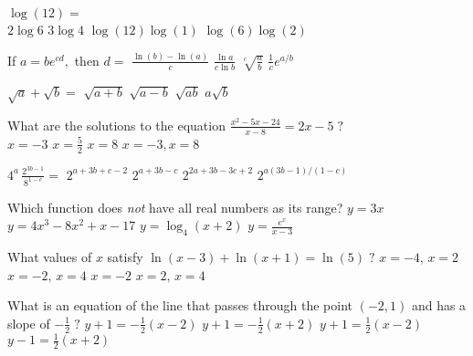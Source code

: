 \begin{question}
\(\log(12) =\) \\
\choices
{\(2 \log 6\)}
{\(3 \log 4\)}
{}
{\(\log(12) \log(1)\)}
{\(\log(6) \log(2)\)}
\end{question}

\begin{question}
If \(a = be^{cd},\) then \(d =\)
\choices
{\(\frac{\ln(b) - \ln(a)}{c}\)}
{\(\frac{\ln a}{c \ln b}\)}
{\(\sqrt[c]{\frac{a}{b}}\)}
{\(\frac{1}{c} e^{a/b}\)}
{}
\end{question}

\begin{question}
\(\sqrt a + \sqrt b = \)
\choices
{\(\sqrt{a + b}\)}
{\(\sqrt{a - b}\)}
{\(\sqrt{ab}\)}
{\(a \sqrt{b}\)}
{}
\end{question}

\begin{question} 
What are the solutions to the equation \(\frac{x^2 - 5x - 24}{x - 8} = 2x -5 \; ?\) \\ 
\choices
{\(x = -3\)}
{\(x = \frac{5}{2}\)}
{\(x = 8\)}
{\(x = -3, x = 8\)}
{}
\end{question}

\begin{question} 
\(4^a \, \frac{2^{3b - 1}}{8^{1 - c}} =\)
\choices
{\(2^{a + 3b + c - 2}\)}
{\(2^{a + 3b - c}\)}
{\(2^{2a + 3b - 3c + 2}\)}
{}
{\(2^{a(3b - 1)/(1 - c)}\)}
\end{question}

\begin{question}
Which function does \emph{not} have all real numbers as its range?
\choices
{\(y = 3x\)}
{\(y = 4x^3 - 8x^2 + x - 17\)}
{\(y = \log_4(x + 2)\)}
{}
{\(y = \frac{e^x}{x - 3}\)}
\end{question}

\begin{question}
What values of \(x\) satisfy \(\ln(x - 3) + \ln(x + 1) = \ln(5) \; ?\) 
\choices
{\(x = -4, \, x = 2\)}
{\(x = -2, \, x = 4\)}
{\(x = -2\)}
{\(x = 2, \, x = 4\)}
{}
\end{question}

\begin{question}
What is an equation of the line that passes through the point \((-2, 1)\) and has a slope of \(-\frac{1}{2} \; ?\)
\choices
{\(y + 1 = -\frac{1}{2}(x - 2)\)}
{\(y + 1 = -\frac{1}{2}(x + 2)\)}
{}
{{\(y + 1 = \frac{1}{2}(x - 2)\)}}
{{\(y - 1 = \frac{1}{2}(x + 2)\)}}
\end{question}

